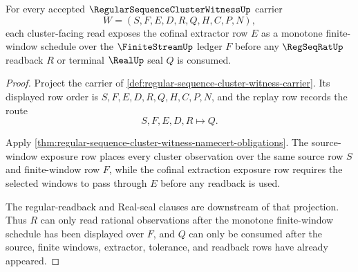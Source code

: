 \begin{theorem}
\label{thm:regular-sequence-cluster-witness-monotone-extraction}
For every accepted $\RegularSequenceClusterWitnessUp$ carrier
$$
W=(S,F,E,D,R,Q,H,C,P,N),
$$
each cluster-facing read exposes the cofinal extractor row $E$ as a monotone finite-window schedule over the $\FiniteStreamUp$ ledger $F$ before any $\RegSeqRatUp$ readback $R$ or terminal $\RealUp$ seal $Q$ is consumed.
\end{theorem}
\begin{proof}
Project the carrier of \autoref{def:regular-sequence-cluster-witness-carrier}. Its displayed row order is $S,F,E,D,R,Q,H,C,P,N$, and the replay row records the route
$$
S,F,E,D,R\longmapsto Q .
$$

Apply \autoref{thm:regular-sequence-cluster-witness-namecert-obligations}. The source-window exposure row places every cluster observation over the same source row $S$ and finite-window row $F$, while the cofinal extraction exposure row requires the selected windows to pass through $E$ before any readback is used.

The regular-readback and Real-seal clauses are downstream of that projection. Thus $R$ can only read rational observations after the monotone finite-window schedule has been displayed over $F$, and $Q$ can only be consumed after the source, finite windows, extractor, tolerance, and readback rows have already appeared.
\end{proof}




